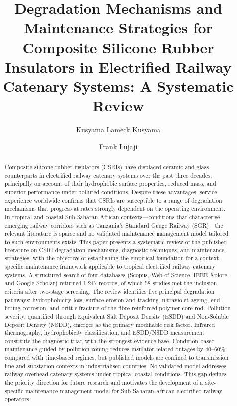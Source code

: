 \documentclass[preprint,12pt,3p]{elsarticle}
\begin{document}
\begin{frontmatter}

\title{Degradation Mechanisms and Maintenance Strategies for Composite
Silicone Rubber Insulators in Electrified Railway Catenary Systems:
A Systematic Review}

\author[dit]{Kusyama Lameck Kusyama}
\author[dit]{Frank Lujaji}

\address[dit]{Department of Mechanical and Industrial Engineering,
Dar es Salaam Institute of Technology, P.O. Box 2958, Dar es Salaam, Tanzania}

\begin{abstract}
Composite silicone rubber insulators (CSRIs) have displaced ceramic and
glass counterparts in electrified railway catenary systems over the past
three decades, principally on account of their hydrophobic surface
properties, reduced mass, and superior performance under polluted
conditions. Despite these advantages, service experience worldwide
confirms that CSRIs are susceptible to a range of degradation mechanisms
that progress at rates strongly dependent on the operating environment.
In tropical and coastal Sub-Saharan African contexts---conditions that
characterise emerging railway corridors such as Tanzania's Standard
Gauge Railway (SGR)---the relevant literature is sparse and no validated
maintenance management model tailored to such environments exists. This
paper presents a systematic review of the published literature on CSRI
degradation mechanisms, diagnostic techniques, and maintenance strategies,
with the objective of establishing the empirical foundation for a
context-specific maintenance framework applicable to tropical electrified
railway catenary systems. A structured search of four databases
(Scopus, Web of Science, IEEE Xplore, and Google Scholar) returned
1,247 records, of which 58 studies met the inclusion criteria after
two-stage screening. The review identifies five principal degradation
pathways: hydrophobicity loss, surface erosion and tracking, ultraviolet
ageing, end-fitting corrosion, and brittle fracture of the fibre-reinforced
polymer core rod. Pollution severity, quantified through Equivalent Salt
Deposit Density (ESDD) and Non-Soluble Deposit Density (NSDD), emerges
as the primary modifiable risk factor. Infrared thermography, hydrophobicity
classification, and ESDD/NSDD measurement constitute the diagnostic triad
with the strongest evidence base. Condition-based maintenance guided by
pollution zoning reduces insulator-related outages by 40--60\% compared
with time-based regimes, but published models are confined to transmission
line and substation contexts in industrialised countries. No validated model
addresses railway overhead catenary systems under tropical coastal conditions.
This gap defines the priority direction for future research and motivates
the development of a site-specific maintenance management model for
Sub-Saharan African electrified railway operators.
\end{abstract}


\end{frontmatter}
\end{document}
